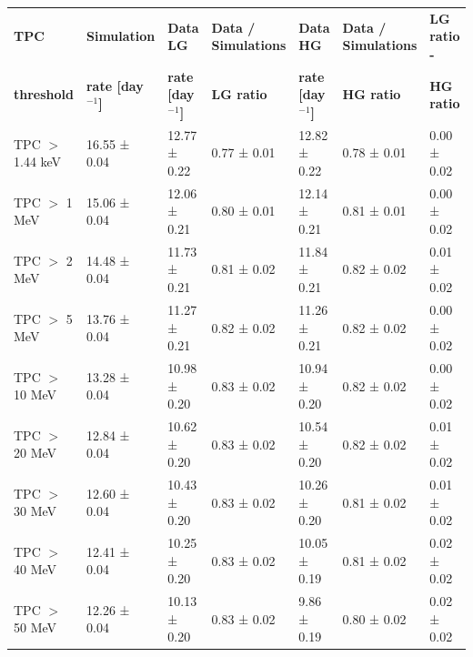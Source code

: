 \begin{landscape}
\begin{table}[ht!]
    \begin{tabular}{lllllll}
    \hline\hline
    \textbf{TPC} & \textbf{Simulation} & \textbf{Data LG} & \textbf{Data / Simulations} & \textbf{Data HG} & \textbf{Data / Simulations} & \textbf{LG ratio -} \\
    \textbf{threshold} & \textbf{rate [day$^{-1}$]} & \textbf{rate [day$^{-1}$]} & \textbf{LG ratio} & \textbf{rate [day$^{-1}$]} & \textbf{HG ratio} & \textbf{HG ratio} \\
    \hline
    TPC $>$ 1.44 keV & 16.55 ± 0.04 & 12.77 ± 0.22 & 0.77 ± 0.01  & 12.82 ± 0.22 & 0.78 ± 0.01  &0.00 ± 0.02 \\ 
    TPC $>$ 1 MeV & 15.06 ± 0.04 & 12.06 ± 0.21 & 0.80 ± 0.01  & 12.14 ± 0.21 & 0.81 ± 0.01  &0.00 ± 0.02 \\ 
    TPC $>$ 2 MeV & 14.48 ± 0.04 & 11.73 ± 0.21 & 0.81 ± 0.02  & 11.84 ± 0.21 & 0.82 ± 0.02  &0.01 ± 0.02 \\ 
    TPC $>$ 5 MeV & 13.76 ± 0.04 & 11.27 ± 0.21 & 0.82 ± 0.02  & 11.26 ± 0.21 & 0.82 ± 0.02  &0.00 ± 0.02 \\ 
    TPC $>$ 10 MeV & 13.28 ± 0.04 & 10.98 ± 0.20 & 0.83 ± 0.02  & 10.94 ± 0.20 & 0.82 ± 0.02  &0.00 ± 0.02 \\ 
    TPC $>$ 20 MeV & 12.84 ± 0.04 & 10.62 ± 0.20 & 0.83 ± 0.02  & 10.54 ± 0.20 & 0.82 ± 0.02  &0.01 ± 0.02 \\ 
    TPC $>$ 30 MeV & 12.60 ± 0.04 & 10.43 ± 0.20 & 0.83 ± 0.02  & 10.26 ± 0.20 & 0.81 ± 0.02  &0.01 ± 0.02 \\ 
    TPC $>$ 40 MeV & 12.41 ± 0.04 & 10.25 ± 0.20 & 0.83 ± 0.02  & 10.05 ± 0.19 & 0.81 ± 0.02  &0.02 ± 0.02 \\ 
    TPC $>$ 50 MeV & 12.26 ± 0.04 & 10.13 ± 0.20 & 0.83 ± 0.02  &  9.86 ± 0.19 & 0.80 ± 0.02  &0.02 ± 0.02 \\
    \hline\hline
    \end{tabular}
    \label{tab:Muons/Rates2024}
\end{table}
\end{landscape}

